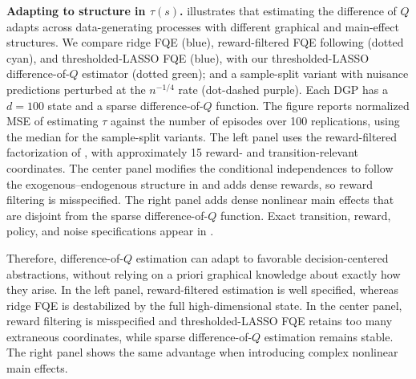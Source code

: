 \documentclass[opre,nonblindrev]{informs4}
\newcommand{\blipadv}{\tau}
\begin{document}
\textbf{Adapting to structure in $\tau(s)$. }
  illustrates that
  estimating the difference
  of $Q$ adapts across data-generating processes with
  different graphical and
  main-effect structures.  We compare ridge FQE (blue), reward-filtered FQE following \citep{zhou2024rewardrelevancefiltered} (dotted cyan), and
  thresholded-LASSO FQE (blue), with
  our thresholded-LASSO difference-of-$Q$ estimator (dotted green); and a sample-split variant with nuisance predictions
  perturbed at the
  $n^{-1/4}$ rate (dot-dashed purple). Each DGP has a $d=100$ state
  and a sparse
  difference-of-$Q$ function. The figure reports normalized MSE of estimating $\blipadv$
  against the number of
  episodes over 100 replications, using the median for
  the sample-split
  variants. The left panel uses the
  reward-filtered
  factorization of
  \citet{zhou2024rewardrelevancefiltered}, with
  approximately
  15 reward- and transition-relevant coordinates. The
  center panel modifies
  the conditional independences to follow the
  exogenous--endogenous structure
  in  and adds dense rewards, so
  reward filtering is
  misspecified. The right panel adds dense nonlinear
  main effects that are
  disjoint from the sparse difference-of-$Q$ function.
  Exact transition,
  reward, policy, and noise specifications appear in
  .



Therefore, difference-of-$Q$ estimation can adapt to favorable decision-centered abstractions, without relying on a priori graphical knowledge about exactly how they arise. In the left panel,
  reward-filtered estimation
  is well specified, whereas ridge FQE is destabilized
  by the full
  high-dimensional state. In the center panel, reward
  filtering is
  misspecified and thresholded-LASSO FQE retains too
  many extraneous
  coordinates, while sparse difference-of-$Q$
  estimation remains stable. The
  right panel shows the same advantage when introducing complex
  nonlinear main effects. 
\end{document}
